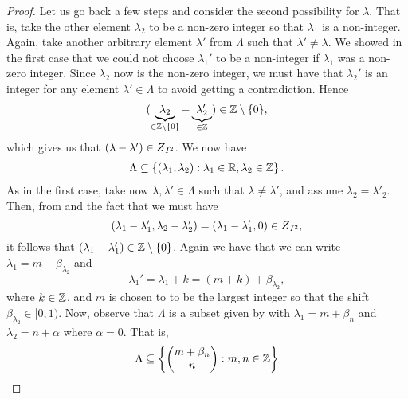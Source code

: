 \documentclass[../thesis.tex]{subfiles}
\begin{document}
\begin{proof}
    Let us go back a few steps and consider the second possibility for $\lambda$. That is, take the other element $\lambda_2$ to be a non-zero integer so that $\lambda_1$ is a non-integer. Again, take another arbitrary element $\lambda'$ from $\Lambda$ such that $\lambda'\neq \lambda$. We showed in the first case that we could not choose $\lambda_1'$ to be a non-integer if $\lambda_1$ was a non-zero integer. Since $\lambda_2$ now is the non-zero integer, we must have that $\lambda_2'$ is an integer for any element $\lambda'\in \Lambda$ to avoid getting a contradiction. Hence
    \begin{align*}
        (\underbrace{\lambda_2}_{\in \mathbb{Z}\setminus\{0\}}-\underbrace{\lambda_2'}_{\in \mathbb{Z}}) \in \mathbb{Z}\setminus\{0\},
    \end{align*}
    which gives us that $\brac{\lambda-\lambda'} \in \Zstroke_{I^2}$. We now have
    \begin{align*}
        \Lambda \subseteq \left\{ \left(\lambda_1, \lambda_2\right) : \lambda_1 \in \mathbb{R}, \lambda_2 \in \mathbb{Z}\right\}.
    \end{align*}
    As in the first case, take now $\lambda, \lambda' \in \Lambda$ such that $\lambda\neq \lambda'$, and assume $\lambda_2 = \lambda'_2$. Then, from  and the fact that we must have 
    \begin{equation*}
        \brac{\lambda_1-\lambda'_1,\lambda_2-\lambda'_2} = \brac{\lambda_1-\lambda'_1,0}\in \Zstroke_{I^2},
    \end{equation*}
    it follows that $(\lambda_1- \lambda_1') \in \mathbb{Z}\setminus\{0\}$. Again we have that we can write $\lambda_1  = m+\beta_{\lambda_2}$ and 
    \begin{equation*}
        \lambda_1'  = \lambda_1 + k = (m+k) + \beta_{\lambda_2},
    \end{equation*}
    where $k \in \mathbb{Z}$, and $m$ is chosen to to be the largest integer so that the shift $\beta_{\lambda_2} \in [0,1)$. Now, observe that $\Lambda$ is a subset given by  with $\lambda_1 = m + \beta_n$ and $\lambda_2 = n+\alpha$ where $\alpha = 0$. That is,
    \begin{equation*}  %
        \Lambda \subseteq \braqMed{\begin{pmatrix} m +\beta_n \\ n\end{pmatrix} : m,n \in \Z} 

\end{equation*}
\end{proof}
\end{document}
